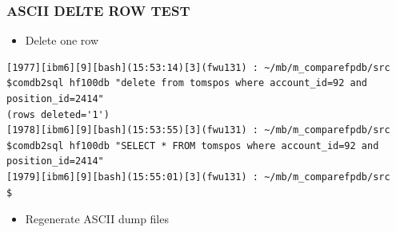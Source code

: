 \documentclass[8pt,]{article}
\providecommand{\tightlist}{%
  \setlength{\itemsep}{0pt}\setlength{\parskip}{0pt}}
\begin{document}
\subsubsection{ASCII DELTE ROW TEST}\label{ascii-delte-row-test}

\begin{itemize}
\tightlist
\item
  Delete one row
\end{itemize}

\begin{verbatim}
[1977][ibm6][9][bash](15:53:14)[3](fwu131) : ~/mb/m_comparefpdb/src
$comdb2sql hf100db "delete from tomspos where account_id=92 and position_id=2414"
(rows deleted='1')
[1978][ibm6][9][bash](15:53:55)[3](fwu131) : ~/mb/m_comparefpdb/src
$comdb2sql hf100db "SELECT * FROM tomspos where account_id=92 and position_id=2414"
[1979][ibm6][9][bash](15:55:01)[3](fwu131) : ~/mb/m_comparefpdb/src
$
\end{verbatim}

\begin{itemize}
\tightlist
\item
  Regenerate ASCII dump files
\end{itemize}
\end{document}
